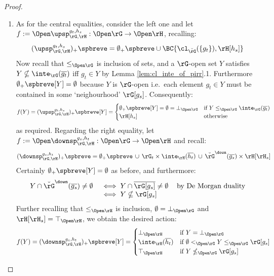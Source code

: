 \documentclass{article}
\begin{document}
\begin{proof}
\begin{enumerate}
\begin{enumerate}
\item
As for the central equalities, consider the left one and let $f := \Open \upsp_{\rG,\rH}^{g_t,h_s} : \Open\rG \to \Open\rH$, recalling: 
\[
(\upsp_{\rG,\rH}^{g_t,h_s})_+\spbreve
= \emptyset_+\spbreve \cup \BC{\cl_{\breve{\rG}}(\{g_t\}),\rH[h_s]}
\]
Now recall that $\leq_{\Open\rG}$ is inclusion of sets, and a $\rG$-open set $Y$ satisfies $Y \nsubseteq \inte_\rG(\overline{g_t})$ iff $g_t \in Y$ by Lemma \ref{lem:cl_inte_of_pirr}.1. Furthermore $\emptyset_+\spbreve[Y] = \emptyset$ because $Y$ is $\rG$-open i.e.\ each element $g_t \in Y$ must be contained in some `neighourhood' $\rG[g_s]$. Consequently:
\[
f(Y) 
= (\upsp_{\rG,\rH}^{g_t,h_s})_+\spbreve[Y] =
\begin{cases}
\emptyset_+\spbreve[Y] = \emptyset = \bot_{\Open\rG} & \text{if $Y \leq_{\Open\rG} \inte_\rG(\overline{g_t})$}
\\
\rH[h_s] & \text{otherwise}
\end{cases}
\]
as required. Regarding the right equality, let $f := \Open \downsp_{\rG,\rH}^{g_s,h_t} : \Open\rG \to \Open\rH$ and recall:
\[
(\downsp_{\rG,\rH}^{g_s,h_t})_+\spbreve
= \emptyset_+\spbreve \,\cup\, \rG_t \times \inte_\rH(\overline{h_t}) \, \cup \, \breve{\rG}^\down(\overline{g_s}) \times \rH[\rH_s]
\]
Certainly $\emptyset_+\spbreve[Y] = \emptyset$ as before, and furthermore:
\[
\begin{tabular}{lll}
$Y \cap \breve{\rG}^\down(\overline{g_s}) \neq \emptyset$
&
$\iff Y \cap \overline{\rG[g_s]} \neq \emptyset$
& by De Morgan duality
\\&
$\iff Y \nsubseteq \rG[g_s]$
\end{tabular}
\]
Further recalling that $\leq_{\Open\rH}$ is inclusion, $\emptyset = \bot_{\Open\rG}$ and  $\rH[\rH_s] = \top_{\Open\rH}$, we obtain the desired action:
\[
f(Y) 
= (\downsp_{\rG,\rH}^{g_s,h_t})_+\spbreve[Y] =
\begin{cases}
\bot_{\Open\rH} & \text{if $Y = \bot_{\Open\rG}$}
\\
\inte_\rH(\overline{h_t}) & \text{if $\emptyset <_{\Open\rG} Y \leq_{\Open\rG} \rG[g_s]$}
\\
\top_{\Open\rH} & \text{if $Y \nleq_{\Open\rG} \rG[g_s]$}
\end{cases}
\]



\end{enumerate}
\end{enumerate}
\end{proof}
\end{document}
